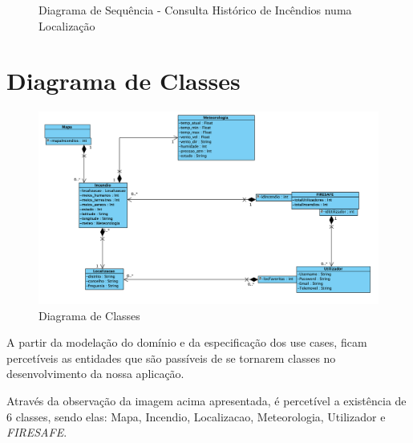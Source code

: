 \documentclass[a4paper,12pt]{scrreprt}
\newcommand{\tab}{
    \hspace{1cm}}
\begin{document}
\begin{figure}[hbt!]
    \centering
    \caption{Diagrama de Sequência - Consulta Histórico de Incêndios numa Localização}
\end{figure}


\chapter{Diagrama de Classes}

\begin{figure}[hbt!]
    \centering
    \includegraphics[width=1\textwidth]{images/Fase2/08.DiagramaDeClasses/diagramaClasses.png}
    \caption{Diagrama de Classes}
\end{figure}

\tab A partir da modelação do domínio e da especificação dos use cases, ficam percetíveis as entidades que são passíveis de se tornarem classes no desenvolvimento da nossa aplicação.

\tab Através da observação da imagem acima apresentada, é percetível a existência de 6 classes, sendo elas: Mapa, Incendio, Localizacao, Meteorologia, Utilizador e \textit{FIRESAFE}.
\end{document}
